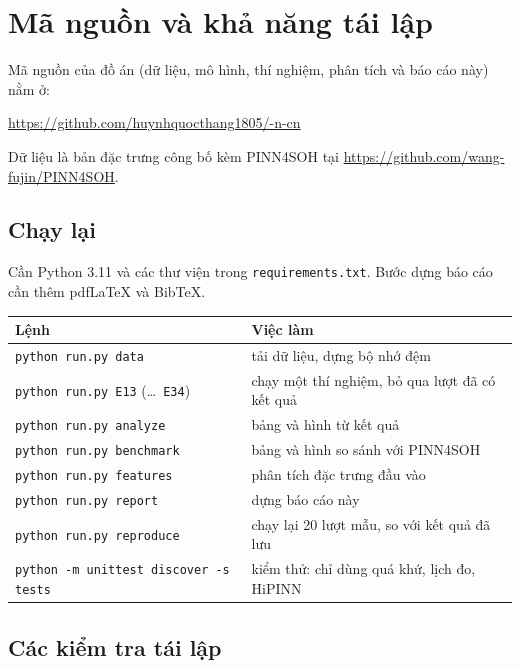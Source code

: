\chapter{Mã nguồn và khả năng tái lập}
\label{app:source-code}

\noindent
Mã nguồn của đồ án (dữ liệu, mô hình, thí nghiệm, phân tích và báo cáo này) nằm ở:
\begin{center}
  \url{https://github.com/huynhquocthang1805/-n-cn}
\end{center}
Dữ liệu là bản đặc trưng công bố kèm PINN4SOH tại \url{https://github.com/wang-fujin/PINN4SOH}.

\section{Chạy lại}

Cần Python 3.11 và các thư viện trong \texttt{requirements.txt}. Bước dựng báo cáo cần thêm pdf\LaTeX{} và Bib\TeX.
\begin{center}\small
\begin{tabular}{@{}ll@{}}
\toprule
Lệnh & Việc làm \\
\midrule
\texttt{python run.py data} & tải dữ liệu, dựng bộ nhớ đệm \\
\texttt{python run.py E13} (\ldots\ \texttt{E34}) & chạy một thí nghiệm, bỏ qua lượt đã có kết quả \\
\texttt{python run.py analyze} & bảng và hình từ kết quả \\
\texttt{python run.py benchmark} & bảng và hình so sánh với PINN4SOH \\
\texttt{python run.py features} & phân tích đặc trưng đầu vào \\
\texttt{python run.py report} & dựng báo cáo này \\
\texttt{python run.py reproduce} & chạy lại 20 lượt mẫu, so với kết quả đã lưu \\
\texttt{python -m unittest discover -s tests} & kiểm thử: chỉ dùng quá khứ, lịch đo, HiPINN \\
\bottomrule
\end{tabular}
\end{center}

\section{Các kiểm tra tái lập}\label{sec:tailap}


